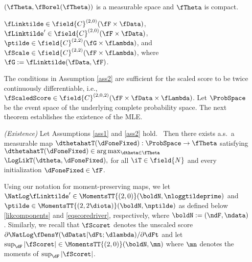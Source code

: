 \begin{ass}
\label{ass1}
$(\fTheta,\fBorel(\fTheta))$ is a measurable space and $\fTheta$ is  compact.
\end{ass}

\begin{ass}
\label{ass2}
$\fLinktilde\in \field{C}^{(2,0)}(\fF\times\fData)$, 
$\fLinktilde'\in \field{C}^{(2,0)}(\fF\times\fData)$, 
$\ptilde \in \field{C}^{(2,2)}(\fG\times \fLambda)$, and 
$\fScale \in \field{C}^{(2,2)}(\fF \times \fLambda)$,
where $\fG:=\fLinktilde(\fData,\fF)$.
\end{ass}

The conditions in Assumption \ref{ass2} are sufficient for the scaled score to be twice continuously differentiable, i.e.,
$\fScaledScore \in \field{C}^{(2,0,2)}(\fF \times \fData \times \fLambda)$. 
Let $\ProbSpace$ be the event space of the underlying complete probability space.
The next theorem establishes the existence of the MLE.


\begin{theo} \label{theo1}
\emph{(Existence)} Let Assumptions \ref{ass1} and \ref{ass2} hold.
\ Then there exists a.s.~a measurable map 
$\dthetahatT(\dFoneFixed):\ProbSpace \to \fTheta$ satisfying 
$\dthetahatT(\dFoneFixed) \in \arg\max_{\dtheta \in \fTheta} $ $\LogLikT(\dtheta,\dFoneFixed),$
for all $\iT \in \field{N}$ and every initialization $\dFoneFixed \in \fF$.
\end{theo}






%
Using our notation for moment-preserving maps, we let $\NatLog \fLinktilde' \in \MomentsTT{(2,0)}(\boldN,\nloggtildeprime)$ and $\ptilde \in \MomentsTT{(2,2\diota)}(\boldN,\nptilde)$  as defined below \eqref{likcomponents} and \eqref{eqscoredriver}, respectively, where $\boldN:=(\ndF,\ndata)$.
Similarly, we recall that $\fScoret$ denotes the unscaled score $\partial \NatLog \fDensY(\dDatat| \dFt; \dlambda)/\partial \dFt$ and let $\sup_{\dF}|\fScoret| \in \MomentsTT{(2,0)}(\boldN,\mn)$ where $\mn$ denotes the moments of $\sup_{\dF}|\fScoret|$.

